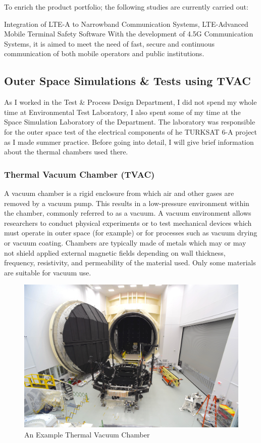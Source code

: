 	To enrich the product portfolio; the following studies are currently carried out:

	Integration of LTE-A to Narrowband Communication Systems,
LTE-Advanced Mobile Terminal Safety Software  
With the development of 4.5G Communication Systems, it is aimed to meet the need of fast, secure and continuous communication of both mobile operators and public institutions\cite{ulak}.


\vfill


\subsection{Outer Space Simulations \& Tests using TVAC  }
\- \indent
	As I worked in the Test \& Process Design Department, I did not spend my whole time at Environmental Test Laboratory, I also spent some of my time at the Space Simulation Laboratory of the Department. The laboratory was responsible for the outer space test of the electrical components of he TURKSAT 6-A project as I made summer practice. Before going into detail, I will give brief information about the thermal chambers used there.
	
\subsubsection{Thermal Vacuum Chamber (TVAC) }
\- \indent
	A vacuum chamber is a rigid enclosure from which air and other gases are removed by a vacuum pump. This results in a low-pressure environment within the chamber, commonly referred to as a vacuum. A vacuum environment allows researchers to conduct physical experiments or to test mechanical devices which must operate in outer space (for example) or for processes such as vacuum drying or vacuum coating. Chambers are typically made of metals which may or may not shield applied external magnetic fields depending on wall thickness, frequency, resistivity, and permeability of the material used. Only some materials are suitable for vacuum use\cite{tvac}.


\begin{figure}[h!]
	\center
	\setlength{\unitlength}{\textwidth} 
	\includegraphics[width=0.9\unitlength]{tvac}
	\caption{\label{fig:tvac}An Example Thermal Vacuum Chamber \cite{tvac}}
\end{figure}

